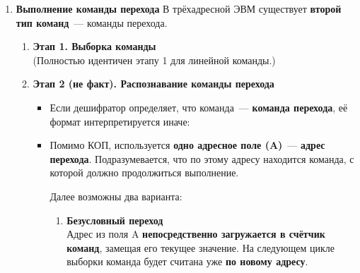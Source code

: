 \documentclass[12px]{article}
\begin{document}
\begin{enumerate}
\begin{enumerate}
\begin{itemize}
\item \textbf{Кратко:} инкремент счётчика команды. 
\end{itemize}
\end{enumerate}
На это цикл заканчивается и всё начинается заново.\\\\
    \textbf{Особенности:}
	\begin{enumerate}
      \item В системе \textbf{нет механизма}, позволяющего определить конец программы.
      \item Цикл выполнения \textbf{не прерывается}, пока включено питание.
      \item \textbf{Команды остановки не существует.}
      \item Машина представляет собой автомат, предназначенный \textbf{только для бесконечного выполнения этого цикла}. 
	\end{enumerate}
    \textbf{Примечание:} описанный выше цикл справедлив \textbf{только для линейных команд}.  
    \item \textbf{Выполнение команды перехода}
      В трёхадресной ЭВМ существует \textbf{второй тип команд}~--- команды перехода.

    \begin{enumerate}
      \item \textbf{Этап 1. Выборка команды} \\
      (Полностью идентичен этапу 1 для линейной команды.)

      \item \textbf{Этап 2 (не факт). Распознавание команды перехода} 
	\begin{itemize}
	      	\item Если дешифратор определяет, что команда~--- \textbf{команда перехода}, её формат интерпретируется иначе:
      \item Помимо КОП, используется \textbf{одно адресное поле (A)}~--- \textbf{адрес перехода}. Подразумевается, что по этому адресу находится команда, с которой должно продолжиться выполнение.

      Далее возможны два варианта:
\begin{enumerate}
      \item \textbf{Безусловный переход} \\
      Адрес из поля A \textbf{непосредственно загружается в счётчик команд}, замещая его текущее значение.  
      На следующем цикле выборки команда будет считана уже \textbf{по новому адресу}.


\end{enumerate}
\end{itemize}
\end{enumerate}
\end{enumerate}
\end{document}
